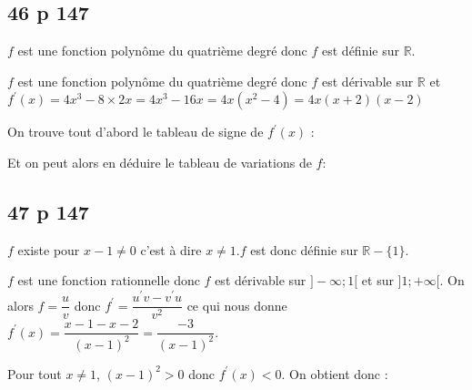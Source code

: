 \documentclass[12pt,a4paper]{book}
\begin{document}
\subsection*{46 p 147}
\begin{enumMet}
    \item $f$ est une fonction polynôme du quatrième degré donc $f$ est définie sur $\mathbb{R}$.
    \item $f$ est une fonction polynôme du quatrième degré donc $f$ est dérivable sur $\mathbb{R}$ et $f^{\prime}(x)=4 x^{3}-8 \times 2 x=4 x^{3}-16 x=4 x\left(x^{2}-4\right)=4 x(x+2)(x-2)$
    \item On trouve tout d'abord le tableau de signe de $f^{\prime}(x)$ :\\
    
    Et on peut alors en déduire le tableau de variations de $f$:\\
\end{enumMet}


\subsection*{47 p 147}
\begin{enumMet}
    \item $f$ existe pour $x-1 \neq 0$ c'est à dire $x \neq 1 . f$ est donc définie sur $\mathbb{R}-\{1\}$.
    \item $f$ est une fonction rationnelle donc $f$ est dérivable sur $]-\infty ; 1[$ et sur $] 1 ;+\infty[$. On alors $f=\dfrac{u}{v}$ donc $f^{\prime}=\dfrac{u^{\prime} v-v^{\prime} u}{v^{2}}$ ce qui nous donne
$f^{\prime}(x)=\dfrac{x-1-x-2}{(x-1)^{2}}=\dfrac{-3}{(x-1)^{2}} .$
    \item Pour tout $x \neq 1$, $(x-1)^{2}>0$ donc $f^{\prime}(x)<0$. On obtient donc :\\
\end{enumMet}
\end{document}
